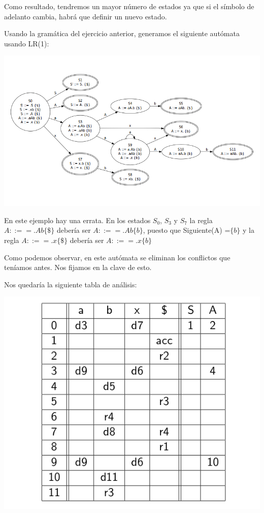 \documentclass{apuntes}
\begin{document}
Como resultado, tendremos un mayor número de estados ya que si el símbolo de adelanto cambia, habrá que definir un nuevo estado.

\begin{example}
Usando la gramática del ejercicio anterior, generamos el siguiente autómata usando LR(1):

\begin{center}
\includegraphics[scale=0.65]{img/automatalr1.jpg}
\end{center}
\obs En este ejemplo hay una errata. En los estados $S_0$, $S_3$ y $S_7$ la regla $A::== .Ab \{\$\}$ debería ser $A::== .Ab \{b\}$, puesto que Siguiente(A) =$\{b\}$ y la regla $A::== .x \{\$\}$ debería ser $A::== .x \{b\}$

Como podemos observar, en este autómata se eliminan los conflictos que teníamos antes. Nos fijamos en la clave de esto.

Nos quedaría la siguiente tabla de análisis:

\begin{center}
\includegraphics[scale=0.4]{img/tablaanalisislr1.jpg}
\end{center}
\end{example}
\end{document}
